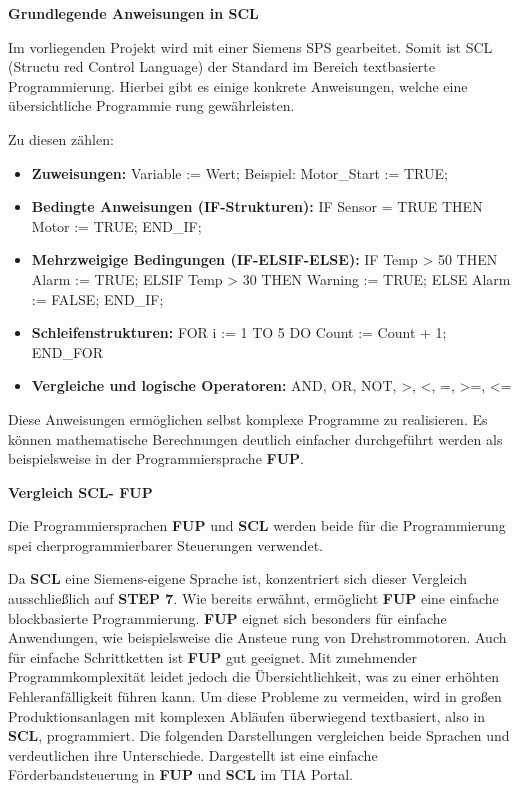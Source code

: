 \textbf{Grundlegende Anweisungen in SCL}


Im vorliegenden Projekt wird mit einer Siemens SPS gearbeitet. Somit ist SCL (Structu
red Control Language) der Standard im Bereich textbasierte Programmierung.
Hierbei gibt es einige konkrete Anweisungen, welche eine übersichtliche Programmie
rung gewährleisten.

Zu diesen zählen:

    \begin{itemize}
        \item \textbf{Zuweisungen:} Variable := Wert; Beispiel: Motor\_Start := TRUE;
        
        \item \textbf{Bedingte Anweisungen (IF-Strukturen):} IF Sensor = TRUE THEN Motor := TRUE; END\_IF;
        
        \item \textbf{Mehrzweigige Bedingungen (IF-ELSIF-ELSE):} IF Temp > 50 THEN Alarm := TRUE; ELSIF Temp > 30 THEN Warning := TRUE; ELSE Alarm := FALSE; END\_IF;
        
        \item \textbf{Schleifenstrukturen:} FOR i := 1 TO 5 DO Count := Count + 1; END\_FOR
        
        \item \textbf{Vergleiche und logische Operatoren:} AND, OR, NOT, >, <, =, >=, <=
        
    \end{itemize}

Diese Anweisungen ermöglichen selbst komplexe Programme zu realisieren. Es können
mathematische Berechnungen deutlich einfacher durchgeführt werden als beispielsweise in der Programmiersprache \textbf{FUP}.


\textbf{Vergleich SCL- FUP}


Die Programmiersprachen \textbf{FUP} und \textbf{SCL} werden beide für die Programmierung spei
cherprogrammierbarer Steuerungen verwendet.

Da \textbf{SCL} eine Siemens-eigene Sprache ist, konzentriert sich dieser Vergleich ausschließlich auf \textbf{STEP 7}.
Wie bereits erwähnt, ermöglicht \textbf{FUP} eine einfache blockbasierte Programmierung.
\textbf{FUP} eignet sich besonders für einfache Anwendungen, wie beispielsweise die Ansteue
rung von Drehstrommotoren. Auch für einfache Schrittketten ist \textbf{FUP} gut geeignet.
Mit zunehmender Programmkomplexität leidet jedoch die Übersichtlichkeit, was zu einer
erhöhten Fehleranfälligkeit führen kann.
Um diese Probleme zu vermeiden, wird in großen Produktionsanlagen mit komplexen Abläufen überwiegend textbasiert, also in \textbf{SCL}, programmiert. Die folgenden Darstellungen vergleichen beide Sprachen und verdeutlichen ihre Unterschiede. Dargestellt ist
eine einfache Förderbandsteuerung in \textbf{FUP} und \textbf{SCL} im TIA Portal.




